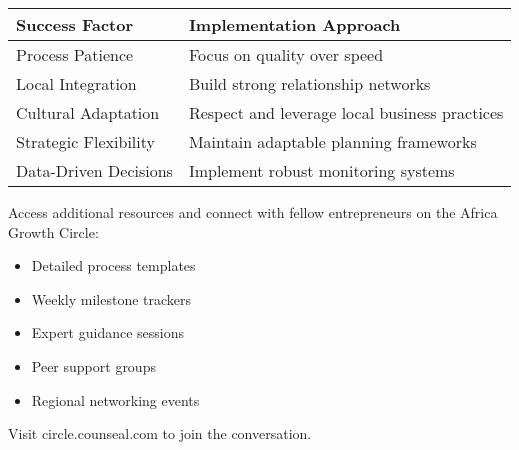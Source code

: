 \begin{tcolorbox}[colback=white,colframe=primarydark,title=\textbf{Success Factors Matrix}]
\begin{center}
\begin{tabularx}{\textwidth}{>{\raggedright\arraybackslash}X >{\raggedright\arraybackslash}X}
    \toprule
    \textbf{Success Factor} & \textbf{Implementation Approach} \\
    \midrule
    Process Patience & Focus on quality over speed \\
    Local Integration & Build strong relationship networks \\
    Cultural Adaptation & Respect and leverage local business practices \\
    Strategic Flexibility & Maintain adaptable planning frameworks \\
    Data-Driven Decisions & Implement robust monitoring systems \\
    \bottomrule
\end{tabularx}
\end{center}
\end{tcolorbox}

\begin{communitybox}
Access additional resources and connect with fellow entrepreneurs on the Africa Growth Circle:
\begin{itemize}
    \item Detailed process templates
    \item Weekly milestone trackers
    \item Expert guidance sessions
    \item Peer support groups
    \item Regional networking events
\end{itemize}
Visit circle.counseal.com to join the conversation.
\end{communitybox}

